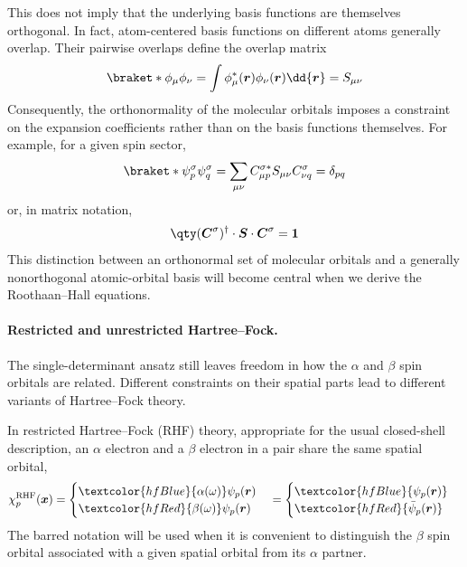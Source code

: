 \documentclass[11pt,a4paper,titlepage]{article}
\numberwithin{equation}{section}
\newcommand{\br}{\boldsymbol{r}}
\newcommand{\bx}{\boldsymbol{x}}
\newcommand{\bC}{\boldsymbol{C}}
\newcommand{\bI}{\boldsymbol{1}}
\newcommand{\bS}{\boldsymbol{S}}
\newcommand{\red}[1]{\textcolor{hfRed}{#1}}
\newcommand{\blue}[1]{\textcolor{hfBlue}{#1}}
\begin{document}
This does not imply that the underlying basis functions are themselves
orthogonal. In fact, atom-centered basis functions on different atoms
generally overlap. Their pairwise overlaps define the overlap matrix
\begin{equation}
  \braket*{\phi_\mu}{\phi_\nu}
  =
  \int
  \phi_\mu^*(\br)
  \phi_\nu(\br)
  \dd{\br}
  =S_{\mu\nu}
\end{equation}
Consequently, the orthonormality of the molecular orbitals imposes a
constraint on the expansion coefficients rather than on the basis functions
themselves. For example, for a given spin sector,
\begin{equation}
  \braket*{\psi_p^\sigma}{\psi_q^\sigma}
  =
  \sum_{\mu\nu}
  C_{\mu p}^{\sigma *}
  S_{\mu\nu}
  C_{\nu q}^{\sigma}
  =
  \delta_{pq}
\end{equation}
or, in matrix notation,
\begin{equation}
  \qty(\bC^\sigma)^\dagger\cdot\bS\cdot\bC^\sigma=\bI
\end{equation}
This distinction between an orthonormal set of molecular orbitals and a
generally nonorthogonal atomic-orbital basis will become central when we
derive the Roothaan--Hall equations.

\paragraph{Restricted and unrestricted Hartree--Fock.}

The single-determinant ansatz still leaves freedom in how the $\alpha$ and
$\beta$ spin orbitals are related. Different constraints on their spatial
parts lead to different variants of Hartree--Fock theory.

In restricted Hartree--Fock (RHF) theory, appropriate for the usual
closed-shell description, an $\alpha$ electron and a $\beta$ electron in a
pair share the same spatial orbital,
\begin{equation}
  \chi_p^\text{RHF}(\bx)
  =
  \begin{cases}
    \blue{\alpha(\omega)}\psi_p(\br)\\
    \red{\beta(\omega)}\psi_p(\br)
  \end{cases}
  =
  \begin{cases}
    \blue{\psi_p(\br)}\\
    \red{\Bar{\psi}_p(\br)}
  \end{cases}
\end{equation}
The barred notation will be used when it is convenient to distinguish the
$\beta$ spin orbital associated with a given spatial orbital from its
$\alpha$ partner.
\end{document}
